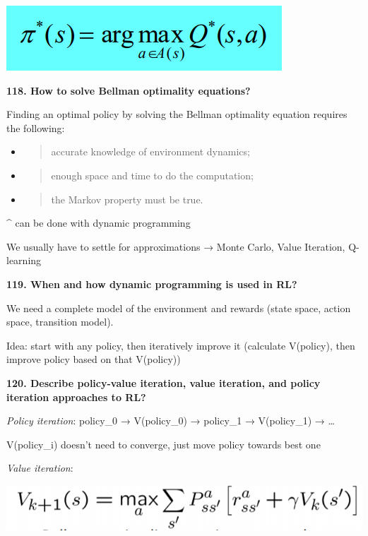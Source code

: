 \includegraphics[width=\columnwidth]{media/image28.png}

\textbf{118. How to solve Bellman optimality equations?}

Finding an optimal policy by solving the Bellman optimality equation
requires the following:

\begin{itemize}
\item
  \begin{quote}
  accurate knowledge of environment dynamics;
  \end{quote}
\item
  \begin{quote}
  enough space and time to do the computation;
  \end{quote}
\item
  \begin{quote}
  the Markov property must be true.
  \end{quote}
\end{itemize}

\^{} can be done with dynamic programming

We usually have to settle for approximations → Monte Carlo, Value
Iteration, Q-learning

\textbf{119. When and how dynamic programming is used in RL?}

We need a complete model of the environment and rewards (state space,
action space, transition model).

Idea: start with any policy, then iteratively improve it (calculate
V(policy), then improve policy based on that V(policy))

\textbf{120. Describe policy-value iteration, value iteration, and
policy iteration approaches to RL?}

\textit{Policy iteration}: policy\_0 → V(policy\_0) → policy\_1 →
V(policy\_1) → \ldots{}

V(policy\_i) doesn't need to converge, just move policy towards best one

\textit{Value iteration}:

\includegraphics[width=\columnwidth]{media/image34.png}


